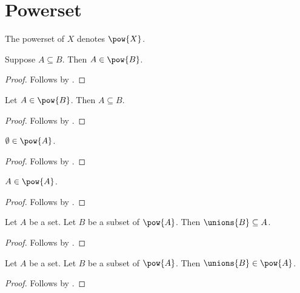

\section{Powerset}

\begin{abbreviation}\label{powerset_of}
    The powerset of $X$ denotes $\pow{X}$.
\end{abbreviation}

\begin{proposition}\label{powerset_intro}
    Suppose $A\subseteq B$.
    Then $A\in\pow{B}$.
\end{proposition}
\begin{proof}
    Follows by .
\end{proof}

\begin{proposition}\label{powerset_elim}
    Let $A\in\pow{B}$.
    Then $A\subseteq B$.
\end{proposition}
\begin{proof}
    Follows by .
\end{proof}

\begin{proposition}\label{powerset_bottom}
    $\emptyset\in\pow{A}$.
\end{proposition}
\begin{proof}
    Follows by .
\end{proof}

\begin{proposition}\label{powerset_top}
    $A\in\pow{A}$.
\end{proposition}
\begin{proof}
    Follows by .
\end{proof}

\begin{proposition}\label{unions_subseteq_of_powerset_is_subseteq}
    Let $A$ be a set.
    Let $B$ be a subset of $\pow{A}$.
    Then $\unions{B}\subseteq A$.
\end{proposition}
\begin{proof}
    Follows by .
\end{proof}

\begin{corollary}\label{powerset_closed_unions}
    Let $A$ be a set.
    Let $B$ be a subset of $\pow{A}$.
    Then $\unions{B}\in\pow{A}$.
\end{corollary}
\begin{proof}
    Follows by .
\end{proof}


